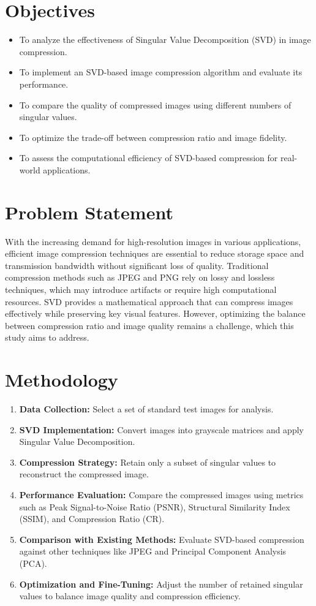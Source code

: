 \documentclass[a4paper,12pt]{article}
\begin{document}
\section{Objectives}
\begin{itemize}
    \item To analyze the effectiveness of Singular Value Decomposition (SVD) in image compression.
    \item To implement an SVD-based image compression algorithm and evaluate its performance.
    \item To compare the quality of compressed images using different numbers of singular values.
    \item To optimize the trade-off between compression ratio and image fidelity.
    \item To assess the computational efficiency of SVD-based compression for real-world applications.
\end{itemize}

\section{Problem Statement}
With the increasing demand for high-resolution images in various applications, efficient image compression techniques are essential to reduce storage space and transmission bandwidth without significant loss of quality. Traditional compression methods such as JPEG and PNG rely on lossy and lossless techniques, which may introduce artifacts or require high computational resources. SVD provides a mathematical approach that can compress images effectively while preserving key visual features. However, optimizing the balance between compression ratio and image quality remains a challenge, which this study aims to address.

\section{Methodology}
\begin{enumerate}
    \item \textbf{Data Collection:} Select a set of standard test images for analysis.
    \item \textbf{SVD Implementation:} Convert images into grayscale matrices and apply Singular Value Decomposition.
    \item \textbf{Compression Strategy:} Retain only a subset of singular values to reconstruct the compressed image.
    \item \textbf{Performance Evaluation:} Compare the compressed images using metrics such as Peak Signal-to-Noise Ratio (PSNR), Structural Similarity Index (SSIM), and Compression Ratio (CR).
    \item \textbf{Comparison with Existing Methods:} Evaluate SVD-based compression against other techniques like JPEG and Principal Component Analysis (PCA).
    \item \textbf{Optimization and Fine-Tuning:} Adjust the number of retained singular values to balance image quality and compression efficiency.
\end{enumerate}
\end{document}
